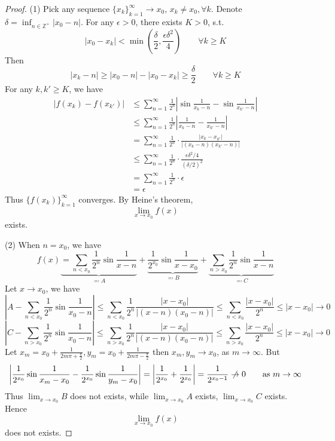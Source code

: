 \begin{proof}
(1) Pick any sequence $\{ x_k \}_{k=1}^{\infty}\to x_0$, $x_k\neq x_0,\forall k$. Denote $\delta=\inf_{n\in \mathbb{Z}^{+}}\lvert x_0-n \rvert$. For any $\epsilon>0$, there exists $K>0$, s.t.
\[
\lvert x_0-x_k \rvert <\min\left( \frac{\delta}{2},\frac{\epsilon\delta^{2}}{4} \right)\qquad \forall k\geq K
\]
Then
\[
\lvert x_k-n \rvert \geq \lvert x_0-n \rvert -\lvert x_0-x_k \rvert \geq \frac{\delta}{2}\qquad \forall k\geq K
\]
For any $k, k'\geq K$, we have
\[
\begin{aligned}
\lvert f(x_k)-f(x_{k'}) \rvert  & \leq \sum_{n=1}^{\infty} \frac{1}{2^{n}}\left\lvert  \sin\frac{1}{x_k-n} -\sin\frac{1}{x_{k'}-n}   \right\rvert  \\
 & \leq \sum_{n=1}^{\infty} \frac{1}{2^{n}}\left\lvert  \frac{1}{x_k-n}-\frac{1}{x_{k'}-n}  \right\rvert  \\
 & =\sum_{n=1}^{\infty} \frac{1}{2^{n}}\cdot\frac{\lvert x_k-x_{k'} \rvert }{\lvert (x_k-n)(x_{k'}-n) \rvert } \\
 & \leq \sum_{n=1}^{\infty} \frac{1}{2^{n}}\cdot  \frac{\epsilon\delta^{2}/4 }{(\delta/2)^2} \\
 & =\sum_{n=1}^{\infty} \frac{1}{2^{n}}\cdot\epsilon \\
 & =\epsilon
\end{aligned}
\]
Thus $\{ f(x_k) \}_{k=1}^{\infty}$ converges. By Heine's theorem,
\[
\lim_{ x \to x_0 } f(x)
\]
exists.

(2) When $n=x_0$, we have
\[
f(x)\underbrace{ =\sum_{n<x_0}\frac{1}{2^{n}}\sin\frac{1}{x-n} }_{ \eqqcolon A }+\underbrace{ \frac{1}{2^{x_0}}\sin\frac{1}{x-x_0} }_{ \eqqcolon B }+\underbrace{ \sum_{n>x_0}\frac{1}{2^{n}}\sin\frac{1}{x-n} }_{ \eqqcolon C }
\]
Let $x\to x_0$, we have
\[
\left\lvert  A -\sum_{n<x_0}\frac{1}{2^{n}}\sin\frac{1}{x_0-n} \right\rvert\leq \sum_{n<x_0}\frac{1}{2^{n}}\frac{\lvert x-x_0 \rvert }{\lvert (x-n)(x_0-n) \rvert }\leq \sum_{n<x_0}\frac{\lvert x-x_0 \rvert }{2^{n}}\leq  \lvert x-x_0 \rvert \to0
\]
\[
\left\lvert  C-\sum_{n>x_0}\frac{1}{2^{n}}\sin\frac{1}{x_0-n}  \right\rvert \leq  \sum_{n>x_0}\frac{1}{2^{n}}\frac{\lvert x-x_0 \rvert }{\lvert (x-n)(x_0-n) \rvert }\leq \sum_{n>x_0}\frac{\lvert x-x_0 \rvert }{2^{n}}\leq  \lvert x-x_0 \rvert \to0
\]
Let $x_m=x_0+\frac{1}{2m\pi+\frac{\pi}{2}},y_m=x_0+\frac{1}{2m\pi-\frac{\pi}{2}}$ then $x_m,y_m\to x_0$, as $m\to \infty$. But
\[
\left\lvert  \frac{1}{2^{x_0}}\sin\frac{1}{x_m-x_0}-\frac{1}{2^{x_0}}\sin\frac{1}{y_m-x_0}  \right\rvert =\left\lvert  \frac{1}{2^{x_0}}+\frac{1}{2^{x_0}}  \right\rvert =\frac{1}{2^{x_0-1}}\centernot{\to}0\qquad \text{as }m\to \infty
\]
Thus $\lim_{ x \to x_0 }B$ does not exists, while $\lim_{ x \to x_0 }A$ exists, $\lim_{ x \to x_0 }C$ exists. Hence
\[
\lim_{ x \to x_0 } f(x)
\]
does not exists.
\end{proof}

